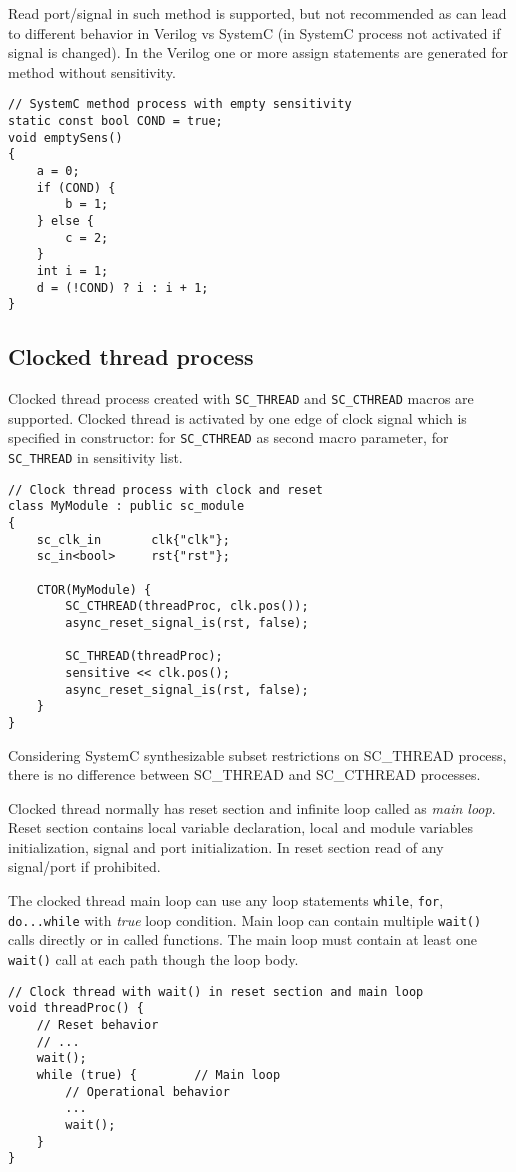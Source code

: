 Read port/signal in such method is supported, but not recommended as can lead to different behavior in Verilog vs SystemC (in SystemC process not activated if signal is changed). In the Verilog one or more assign statements are generated for method without sensitivity. 

\begin{lstlisting}[style=mycpp]
// SystemC method process with empty sensitivity
static const bool COND = true;
void emptySens()
{
    a = 0;
    if (COND) {
        b = 1;
    } else {
        c = 2;
    }
    int i = 1;
    d = (!COND) ? i : i + 1; 
}
\end{lstlisting}


\subsection{Clocked thread process}

Clocked thread process created with {\tt SC\_THREAD} and {\tt SC\_CTHREAD} macros are supported.  
Clocked thread is activated by one edge of clock signal which is specified in constructor: for {\tt SC\_CTHREAD} as second macro parameter, for {\tt SC\_THREAD} in sensitivity list. 
%
\begin{lstlisting}[style=mycpp]
// Clock thread process with clock and reset
class MyModule : public sc_module 
{
    sc_clk_in       clk{"clk"};
    sc_in<bool>     rst{"rst"};
    
	CTOR(MyModule) {
        SC_CTHREAD(threadProc, clk.pos());
        async_reset_signal_is(rst, false);
        
        SC_THREAD(threadProc);
        sensitive << clk.pos();
        async_reset_signal_is(rst, false);
	}     
}
\end{lstlisting}
%
Considering SystemC synthesizable subset restrictions on SC\_THREAD process, there is no difference between SC\_THREAD and SC\_CTHREAD processes.

Clocked thread normally has reset section and infinite loop called as \emph{main loop}. Reset section contains local variable declaration, local and module variables initialization, signal and port initialization. In reset section read of any signal/port if prohibited.

The clocked thread main loop can use any loop statements {\tt while}, {\tt for}, {\tt do...while} with \emph{true} loop condition. Main loop can contain multiple {\tt wait()} calls directly or in called functions. The main loop must contain at least one {\tt wait()} call at each path though the loop body. 
%
\begin{lstlisting}[style=mycpp]
// Clock thread with wait() in reset section and main loop
void threadProc() {
    // Reset behavior
    // ...
    wait();
    while (true) {        // Main loop
        // Operational behavior
        ...
        wait();
    }
}
\end{lstlisting}

